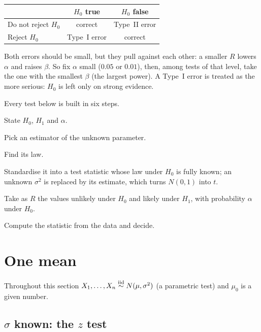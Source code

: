 \begin{center}
\renewcommand{\arraystretch}{1.3}
\begin{tabular}{@{}lcc@{}}
\toprule
 & $H_0$ true & $H_0$ false \\
\midrule
Do not reject $H_0$ & correct & Type~II error \\
Reject $H_0$ & Type~I error & correct \\
\bottomrule
\end{tabular}
\end{center}

Both errors should be small, but they pull against each other: a smaller $R$ lowers $\alpha$ and raises $\beta$. So fix $\alpha$ small ($0.05$ or $0.01$), then, among tests of that level, take the one with the smallest $\beta$ (the largest power). A Type~I error is treated as the more serious: $H_0$ is left only on strong evidence.

\begin{setup}
Every test below is built in six steps.
\begin{steps}
  \item State $H_0$, $H_1$ and $\alpha$.
  \item Pick an estimator of the unknown parameter.
  \item Find its law.
  \item Standardise it into a test statistic whose law under $H_0$ is fully known; an unknown $\sigma^2$ is replaced by its estimate, which turns $N(0,1)$ into $t$.
  \item Take as $R$ the values unlikely under $H_0$ and likely under $H_1$, with probability $\alpha$ under $H_0$.
  \item Compute the statistic from the data and decide.
\end{steps}
\end{setup}

\section{One mean}

Throughout this section $X_1,\dots,X_n\overset{\text{iid}}{\sim} N(\mu,\sigma^2)$ (a parametric test) and $\mu_0$ is a given number.

\subsection*{$\sigma$ known: the $z$ test}

